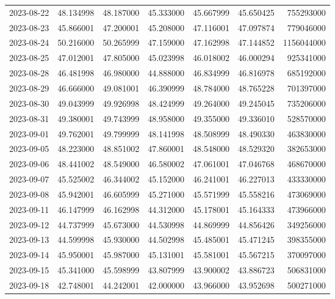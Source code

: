\begin{tabular}{lrrrrrr}
2023-08-22 &   48.134998 &   48.187000 &   45.333000 &   45.667999 &   45.650425 &   755293000 \\
2023-08-23 &   45.866001 &   47.200001 &   45.208000 &   47.116001 &   47.097874 &   779046000 \\
2023-08-24 &   50.216000 &   50.265999 &   47.159000 &   47.162998 &   47.144852 &  1156044000 \\
2023-08-25 &   47.012001 &   47.805000 &   45.023998 &   46.018002 &   46.000294 &   925341000 \\
2023-08-28 &   46.481998 &   46.980000 &   44.888000 &   46.834999 &   46.816978 &   685192000 \\
2023-08-29 &   46.666000 &   49.081001 &   46.390999 &   48.784000 &   48.765228 &   701397000 \\
2023-08-30 &   49.043999 &   49.926998 &   48.424999 &   49.264000 &   49.245045 &   735206000 \\
2023-08-31 &   49.380001 &   49.743999 &   48.958000 &   49.355000 &   49.336010 &   528570000 \\
2023-09-01 &   49.762001 &   49.799999 &   48.141998 &   48.508999 &   48.490330 &   463830000 \\
2023-09-05 &   48.223000 &   48.851002 &   47.860001 &   48.548000 &   48.529320 &   382653000 \\
2023-09-06 &   48.441002 &   48.549000 &   46.580002 &   47.061001 &   47.046768 &   468670000 \\
2023-09-07 &   45.525002 &   46.344002 &   45.152000 &   46.241001 &   46.227013 &   433330000 \\
2023-09-08 &   45.942001 &   46.605999 &   45.271000 &   45.571999 &   45.558216 &   473069000 \\
2023-09-11 &   46.147999 &   46.162998 &   44.312000 &   45.178001 &   45.164333 &   473966000 \\
2023-09-12 &   44.737999 &   45.673000 &   44.530998 &   44.869999 &   44.856426 &   349256000 \\
2023-09-13 &   44.599998 &   45.930000 &   44.502998 &   45.485001 &   45.471245 &   398355000 \\
2023-09-14 &   45.950001 &   45.987000 &   45.131001 &   45.581001 &   45.567215 &   370097000 \\
2023-09-15 &   45.341000 &   45.598999 &   43.807999 &   43.900002 &   43.886723 &   506831000 \\
2023-09-18 &   42.748001 &   44.242001 &   42.000000 &   43.966000 &   43.952698 &   500271000 \\

\end{tabular}
